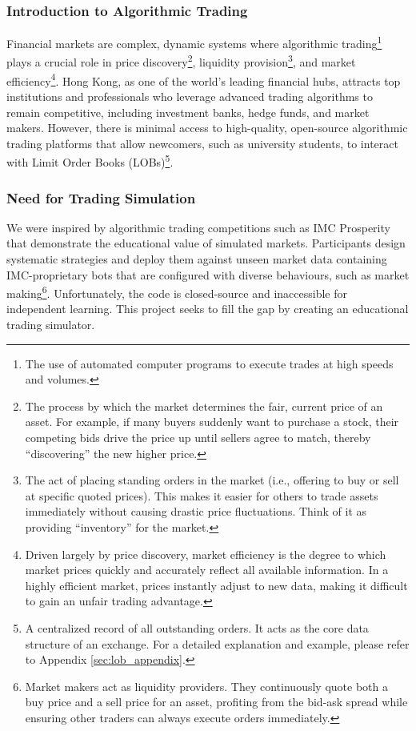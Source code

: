 \documentclass[12pt,a4paper]{article}
\begin{document}
\subsubsection{Introduction to Algorithmic Trading}
Financial markets are complex, dynamic systems where algorithmic trading\footnote{The use of automated computer programs to execute trades at high speeds and volumes.} plays a crucial role in price discovery\footnote{The process by which the market determines the fair, current price of an asset. For example, if many buyers suddenly want to purchase a stock, their competing bids drive the price up until sellers agree to match, thereby ``discovering'' the new higher price.}, liquidity provision\footnote{The act of placing standing orders in the market (i.e., offering to buy or sell at specific quoted prices). This makes it easier for others to trade assets immediately without causing drastic price fluctuations. Think of it as providing ``inventory'' for the market.}, and market efficiency\footnote{Driven largely by price discovery, market efficiency is the degree to which market prices quickly and accurately reflect all available information. In a highly efficient market, prices instantly adjust to new data, making it difficult to gain an unfair trading advantage.}. Hong Kong, as one of the world's leading financial hubs, attracts top institutions and professionals who leverage advanced trading algorithms to remain competitive, including investment banks, hedge funds, and market makers. However, there is minimal access to high-quality, open-source algorithmic trading platforms that allow newcomers, such as university students, to interact with Limit Order Books (LOBs)\footnote{A centralized record of all outstanding orders. It acts as the core data structure of an exchange. For a detailed explanation and example, please refer to Appendix \ref{sec:lob_appendix}.}.

\subsubsection{Need for Trading Simulation}
We were inspired by algorithmic trading competitions such as IMC Prosperity that demonstrate the educational value of simulated markets. Participants design systematic strategies and deploy them against unseen market data containing IMC-proprietary bots that are configured with diverse behaviours, such as market making\footnote{Market makers act as liquidity providers. They continuously quote both a buy price and a sell price for an asset, profiting from the bid-ask spread while ensuring other traders can always execute orders immediately.}. Unfortunately, the code is closed-source and inaccessible for independent learning. This project seeks to fill the gap by creating an educational trading simulator.
\end{document}
